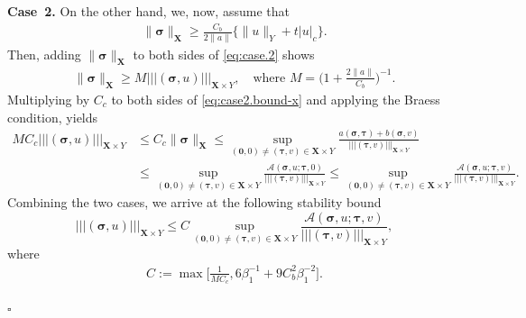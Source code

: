 \documentclass[11pt, reqno, a4paper, twoside]{article}
\newcommand*\tnorm[1]{|\!|\!| #1 |\!|\!|}
\newcommand\bsigma{\boldsymbol{\sigma}}
\newcommand\bzero{\boldsymbol{0}}
\newcommand\btau{\boldsymbol{\tau}}
\newcommand{\bX}{\mathbf{X}}
\newcommand{\bZ}{\mathbf{Z}}
\newenvironment{proof}{\noindent{\it Proof.}}{\hfill$\square$}
\numberwithin{equation}{section}
\numberwithin{remark}{section}
\numberwithin{figure}{section}
\numberwithin{table}{section}
\begin{document}
\begin{proof}
\smallskip 
\noindent
\textbf{Case~2.} On the other hand, we, now, assume that 
\begin{align}\label{eq:case.2}\|\bsigma\|_{\bX}\geq \frac{C_b}{2\|a\|}\{\|u\|_Y+t|u|_c\}.\end{align}
Then, adding \(\|\bsigma\|_{\bX}\) to both sides of \eqref{eq:case.2} shows \begin{align}\label{eq:case2.bound-x}
\|\bsigma\|_{\bX}\geq M\tnorm{(\bsigma,u)}_{\bX\times Y},\quad \text{where } M={\bigl({1+\frac{2\|a\|}{C_b}}\bigr)^{-1}}.\end{align} 
Multiplying by \(C_c\) to both sides of \eqref{eq:case2.bound-x} and applying the Braess condition, yields
\begin{align*}
    MC_c\tnorm{(\bsigma,u)}_{\bX\times Y}&\leq C_c\|\bsigma\|_{\bX}
    \leq\sup_{(\bzero,0)\neq(\btau,v)\in{\bX\times Y}}\frac{a(\bsigma,\btau)+b(\bsigma,v)}{\tnorm{(\btau,v)}_{\bX\times Y}}
    \\&\leq \sup_{(\bzero,0)\neq(\btau,v)\in{\bX\times Y}}\frac{\mathcal{A}(\bsigma,u;\btau,0)}{\tnorm{(\btau,v)}_{\bX\times Y}}
    \leq \sup_{(\bzero,0)\neq(\btau,v)\in{\bX\times Y}}\frac{\mathcal{A}(\bsigma,u;\btau,v)}{\tnorm{(\btau,v)}_{\bX\times Y}}.
\end{align*}
Combining the two cases, we arrive at the following stability bound 
\[\tnorm{(\bsigma,u)}_{\bX\times Y}\leq C  \sup_{(\bzero,0)\neq(\btau,v)\in{\bX\times Y}}\frac{\mathcal{A}(\bsigma,u;\btau,v)}{\tnorm{(\btau,v)}_{\bX\times Y}},\] where \begin{align}\label{eq:C}C:=\max\bigl[\frac{1}{MC_c},6\beta_1^{-1}+9C_b^2\beta_1^{-2}\bigr].\end{align}


\end{proof}
\end{document}
